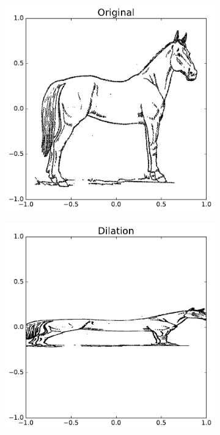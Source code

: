 \begin{figure}[H] %
\captionsetup[subfigure]{justification=centering}
\centering
\begin{subfigure}{.5\textwidth}
    \centering
    \includegraphics[width=\linewidth]{originalHorse.pdf}
\end{subfigure}%
\begin{subfigure}{.5\textwidth}
    \centering
    \includegraphics[width=\linewidth]{DilationHorse.pdf}
\end{subfigure}
\end{figure}

